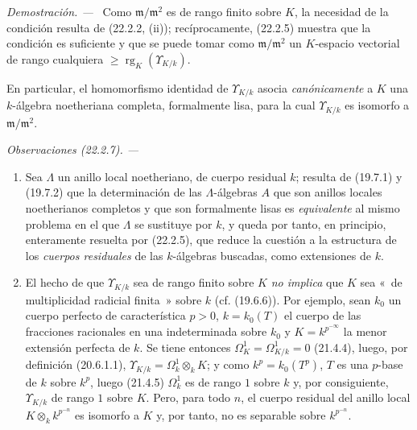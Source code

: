 \documentclass[10pt,oneside]{book}
\makeatletter
\newcommand{\setmanualcurrentlabel}[1]{\def\@currentlabel{#1}}
\newcommand{\oldpage}[2][]{%
  \setcounter{footnote}{0}%
  \marginpar{\scriptsize\textbf{#1}~|~#2}\ignorespaces}
\newenvironment{remarks}[1][]{%
  \setmanualcurrentlabel{#1}\par\medskip\noindent\itshape Observaciones (#1). ---\ }{\par}
\newenvironment{proof}{%
  \par\medskip\noindent\textit{Demostración. ---\ }}{\par}
\makeatother
\begin{document}
\begin{proof}
Como $\mathfrak m/\mathfrak m^2$ es de rango finito sobre $K$, la necesidad
de la condición resulta de (22.2.2, (ii)); recíprocamente, (22.2.5) muestra que
la condición es suficiente y que se puede tomar como
$\mathfrak m/\mathfrak m^2$ un $K$-espacio vectorial de rango cualquiera
$\geqslant\operatorname{rg}_K(\Upsilon_{K/k})$.
\end{proof}

\oldpage[0\textsubscript{IV-1}]{189}

En particular, el homomorfismo identidad de $\Upsilon_{K/k}$ asocia
\emph{canónicamente} a $K$ una $k$-álgebra noetheriana completa, formalmente
lisa, para la cual $\Upsilon_{K/k}$ es isomorfo a
$\mathfrak m/\mathfrak m^2$.

\begin{remarks}[22.2.7]
\label{0.22.2.7-es}
\begin{enumerate}
  \item[(i)] Sea $\Lambda$ un anillo local noetheriano, de cuerpo residual
  $k$; resulta de (19.7.1) y (19.7.2) que la determinación de las
  $\Lambda$-álgebras $A$ que son anillos locales noetherianos completos y que
  son formalmente lisas es \emph{equivalente} al mismo problema en el que
  $\Lambda$ se sustituye por $k$, y queda por tanto, en principio, enteramente
  resuelta por (22.2.5), que reduce la cuestión a la estructura de los
  \emph{cuerpos residuales} de las $k$-álgebras buscadas, como extensiones de
  $k$.

  \item[(ii)] El hecho de que $\Upsilon_{K/k}$ sea de rango finito sobre $K$
  \emph{no implica} que $K$ sea «~de multiplicidad radicial finita~» sobre
  $k$ (cf. (19.6.6)). Por ejemplo, sean $k_0$ un cuerpo perfecto de
  característica $p>0$, $k=k_0(T)$ el cuerpo de las fracciones racionales en
  una indeterminada sobre $k_0$ y $K=k^{p^{-\infty}}$ la menor extensión
  perfecta de $k$. Se tiene entonces $\Omega^1_K=\Omega^1_{K/k}=0$ (21.4.4),
  luego, por definición (20.6.1.1),
  $\Upsilon_{K/k}=\Omega^1_k\otimes_kK$; y como $k^p=k_0(T^p)$, $T$ es una
  $p$-base de $k$ sobre $k^p$, luego (21.4.5) $\Omega^1_k$ es de rango $1$
  sobre $k$ y, por consiguiente, $\Upsilon_{K/k}$ de rango $1$ sobre $K$.
  Pero, para todo $n$, el cuerpo residual del anillo local
  $K\otimes_kk^{p^{-n}}$ es isomorfo a $K$ y, por tanto, no es separable sobre
  $k^{p^{-n}}$.
\end{enumerate}
\end{remarks}
\end{document}
